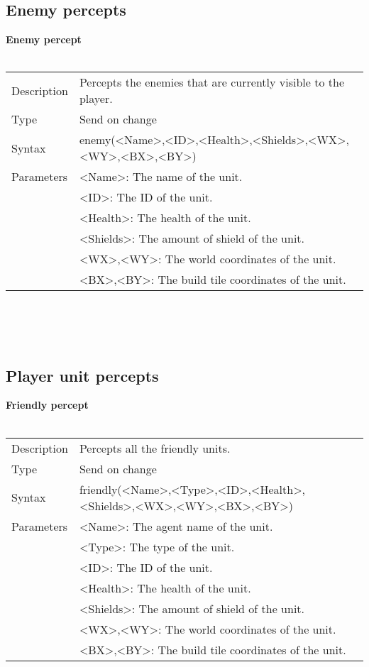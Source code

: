 \documentclass[english,11pt]{report}
\begin{document}
\subsection{Enemy percepts}
\textbf{Enemy percept}\\
\\
\begin{tabularx}{\textwidth}{lX}
 Description & Percepts the enemies that are currently visible to the player. \\
 Type & Send on change \\
 Syntax & enemy(<Name>,<ID>,<Health>,<Shields>,<WX>,<WY>,<BX>,<BY>) \\
 Parameters &   <Name>: The name of the unit.\\
            &   <ID>: The ID of the unit.\\
            &   <Health>: The health of the unit.\\
            &   <Shields>: The amount of shield of the unit.\\
            &   <WX>,<WY>: The world coordinates of the unit.\\
            &   <BX>,<BY>: The build tile coordinates of the unit.
\end{tabularx}\\
\\
\\

\subsection{Player unit percepts}
\textbf{Friendly percept}\\
\\
\begin{tabularx}{\textwidth}{lX}
 Description & Percepts all the friendly units. \\
 Type & Send on change \\
 Syntax & friendly(<Name>,<Type>,<ID>,<Health>,<Shields>,<WX>,<WY>,<BX>,<BY>) \\
 Parameters &   <Name>: The agent name of the unit.\\
            &   <Type>: The type of the unit.\\
            &   <ID>: The ID of the unit.\\
            &   <Health>: The health of the unit.\\
            &   <Shields>: The amount of shield of the unit.\\
            &   <WX>,<WY>: The world coordinates of the unit.\\
            &   <BX>,<BY>: The build tile coordinates of the unit.
\end{tabularx}
\end{document}
